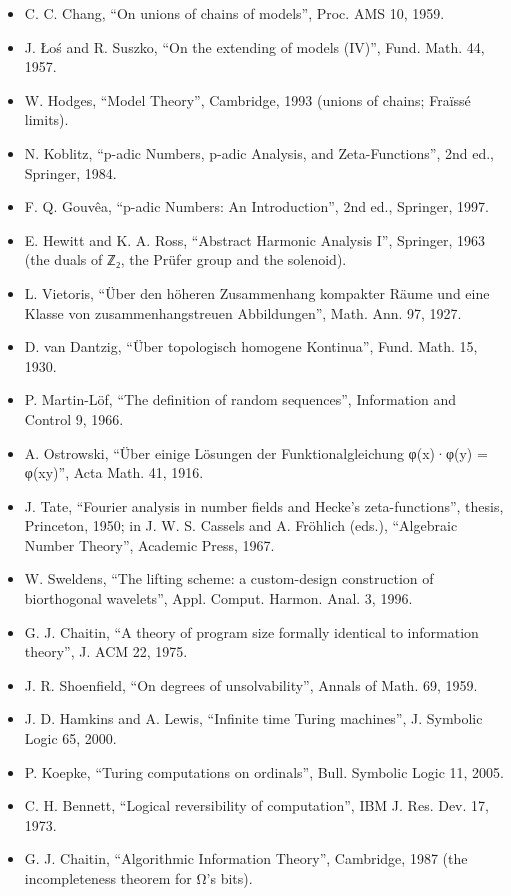 \begin{itemize}
\item C. C. Chang, “On unions of chains of models”, Proc. AMS 10, 1959.
\item J. Łoś and R. Suszko, “On the extending of models (IV)”, Fund. Math. 44, 1957.
\item W. Hodges, “Model Theory”, Cambridge, 1993 (unions of chains; Fraïssé limits).
\item N. Koblitz, “p-adic Numbers, p-adic Analysis, and Zeta-Functions”, 2nd ed., Springer, 1984.
\item F. Q. Gouvêa, “p-adic Numbers: An Introduction”, 2nd ed., Springer, 1997.
\item E. Hewitt and K. A. Ross, “Abstract Harmonic Analysis I”, Springer, 1963 (the duals of ℤ₂, the Prüfer group and the solenoid).
\item L. Vietoris, “Über den höheren Zusammenhang kompakter Räume und eine Klasse von zusammenhangstreuen Abbildungen”, Math. Ann. 97, 1927.
\item D. van Dantzig, “Über topologisch homogene Kontinua”, Fund. Math. 15, 1930.
\item P. Martin-Löf, “The definition of random sequences”, Information and Control 9, 1966.
\item A. Ostrowski, “Über einige Lösungen der Funktionalgleichung φ(x)·φ(y) = φ(xy)”, Acta Math. 41, 1916.
\item J. Tate, “Fourier analysis in number fields and Hecke's zeta-functions”, thesis, Princeton, 1950; in J. W. S. Cassels and A. Fröhlich (eds.), “Algebraic Number Theory”, Academic Press, 1967.
\item W. Sweldens, “The lifting scheme: a custom-design construction of biorthogonal wavelets”, Appl. Comput. Harmon. Anal. 3, 1996.
\item G. J. Chaitin, “A theory of program size formally identical to information theory”, J. ACM 22, 1975.
\item J. R. Shoenfield, “On degrees of unsolvability”, Annals of Math. 69, 1959.
\item J. D. Hamkins and A. Lewis, “Infinite time Turing machines”, J. Symbolic Logic 65, 2000.
\item P. Koepke, “Turing computations on ordinals”, Bull. Symbolic Logic 11, 2005.
\item C. H. Bennett, “Logical reversibility of computation”, IBM J. Res. Dev. 17, 1973.
\item G. J. Chaitin, “Algorithmic Information Theory”, Cambridge, 1987 (the incompleteness theorem for Ω's bits).

\end{itemize}
